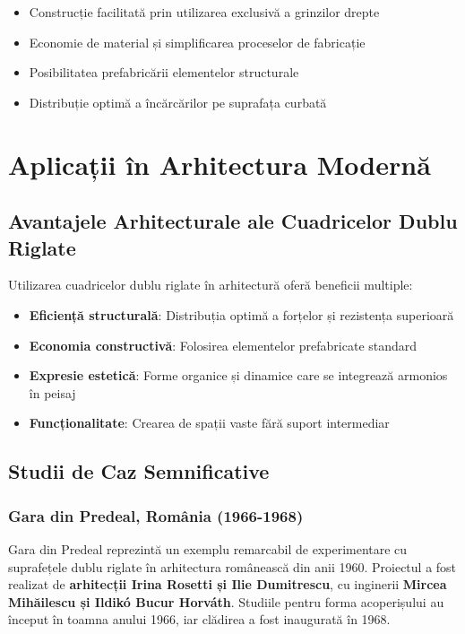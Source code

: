 \documentclass[12pt,a4paper]{article}
\begin{document}
\begin{itemize}
    \item Construcție facilitată prin utilizarea exclusivă a grinzilor drepte
    \item Economie de material și simplificarea proceselor de fabricație
    \item Posibilitatea prefabricării elementelor structurale
    \item Distribuție optimă a încărcărilor pe suprafața curbată
\end{itemize}

\section{Aplicații în Arhitectura Modernă}

\subsection{Avantajele Arhitecturale ale Cuadricelor Dublu Riglate}

Utilizarea cuadricelor dublu riglate în arhitectură oferă beneficii multiple:

\begin{itemize}
    \item \textbf{Eficiență structurală}: Distribuția optimă a forțelor și rezistența superioară
    \item \textbf{Economia constructivă}: Folosirea elementelor prefabricate standard
    \item \textbf{Expresie estetică}: Forme organice și dinamice care se integrează armonios în peisaj
    \item \textbf{Funcționalitate}: Crearea de spații vaste fără suport intermediar
\end{itemize}

\subsection{Studii de Caz Semnificative}

\subsubsection{Gara din Predeal, România (1966-1968)}

Gara din Predeal reprezintă un exemplu remarcabil de experimentare cu suprafețele dublu riglate în arhitectura românească din anii 1960. Proiectul a fost realizat de \textbf{arhitecții Irina Rosetti și Ilie Dumitrescu}, cu inginerii \textbf{Mircea Mihăilescu și Ildikó Bucur Horváth}. Studiile pentru forma acoperișului au început în toamna anului 1966, iar clădirea a fost inaugurată în 1968.
\end{document}
